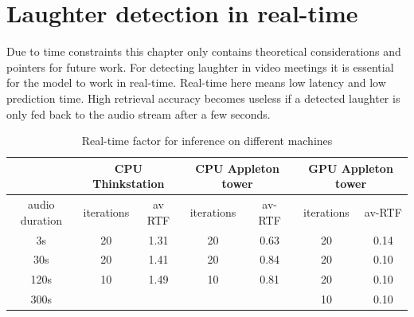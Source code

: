 \documentclass[bsc,frontabs,parskip,deptreport]{infthesis}
\begin{document}
\chapter{Laughter detection in real-time} \label{cha:real-time}
Due to time constraints this chapter only contains theoretical considerations and pointers for future work. 
For detecting laughter in video meetings it is essential for the model to work in real-time. Real-time here means low latency and low prediction time. 
High retrieval accuracy becomes useless if a detected laughter is only fed back to the audio stream after a few seconds.

\begin{table}[]
    \centering
    \begin{tabular}{|c|c|c|c|c|c|c|}
    \hline
    & \multicolumn{2}{|c|}{CPU Thinkstation} &
    \multicolumn{2}{|c|}{CPU Appleton tower} & 
    \multicolumn{2}{|c|}{GPU Appleton tower} \\ 
    \hline
    audio duration & iterations & av RTF &
    iterations & av-RTF & iterations & av-RTF \\
    \hline
    3s & 20 & 1.31   & 20 & 0.63  & 20 & 0.14  \\
    30s & 20 & 1.41  & 20 & 0.84  & 20 & 0.10 \\
    120s & 10 & 1.49 &  10 & 0.81  & 20 & 0.10 \\
    300s &&&&                     & 10 & 0.10 \\
    \hline
    \end{tabular}
    \caption{Real-time factor for inference on different machines}
    \label{tab:rtf}
\end{table}
\end{document}
